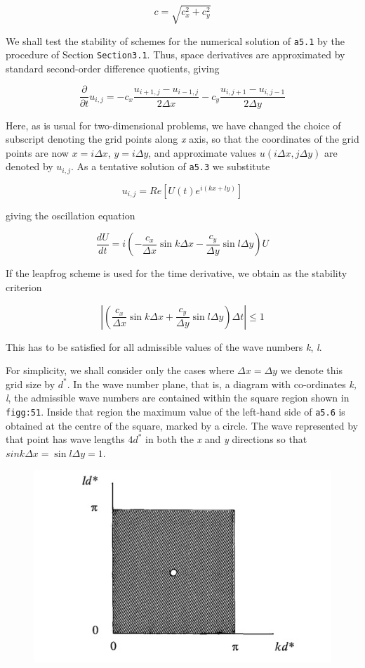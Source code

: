 \[c = \sqrt{c_{x}^{2} + c_{y}^{2}}\]

We shall test the stability of schemes for the numerical solution of
\texttt{a5.1} by the procedure of Section \texttt{Section3.1}. Thus,
space derivatives are approximated by standard second-order difference
quotients, giving

\[\frac{\partial}{\partial t}u_{i,j} = - c_{x}\frac{u_{i + 1,j} - u_{i - 1,j}}{2\Delta x} - c_{y}\frac{u_{i,j + 1} - u_{i,j - 1}}{2\Delta y}\]

Here, as is usual for two-dimensional problems, we have changed the
choice of subscript denoting the grid points along \emph{x} axis, so
that the coordinates of the grid points are now \(x = i\Delta x\),
\(y = i\Delta y\), and approximate values
\(u\left( i\Delta x,j\Delta y \right)\) are denoted by \(u_{i,j}\). As a
tentative solution of \texttt{a5.3} we substitute

\[u_{i,j} = Re\left\lbrack U\left( t \right)e^{i ( kx + ly )} \right\rbrack
\]

giving the oscillation equation

\[\frac{d U}{d t} = i\left( - \frac{c_{x}}{\Delta x}\sin{k\Delta x} -\frac{c_{y}}{\Delta y}\sin{l\Delta y} \right)U\]

If the leapfrog scheme is used for the time derivative, we obtain as the
stability criterion

\[\left| \left( \frac{c_x}{\Delta x}\sin{k\Delta x} +
\frac{c_y}{\Delta y}\sin{l\Delta y} \right)\Delta t \right| \leq 1\]

This has to be satisfied for all admissible values of the wave numbers
\emph{k}, \emph{l}.

For simplicity, we shall consider only the cases where
\(\Delta x = \Delta y\) we denote this grid size by \(d^{*}\). In the
wave number plane, that is, a diagram with co-ordinates \emph{k, l}, the
admissible wave numbers are contained within the square region shown in
\texttt{figg:51}. Inside that region the maximum value of the left-hand
side of \texttt{a5.6} is obtained at the centre of the square, marked by
a circle. The wave represented by that point has wave lengths \(4d^*\)
in both the \emph{x} and \emph{y} directions so that
\(sink{\Delta x} = \sin{l\Delta y} = 1\).

\begin{figure}
\centering
\includegraphics[width = .7 \textwidth]{figs/NM/pic51.jpg}
\caption{} \label{fig:}
\end{figure}

